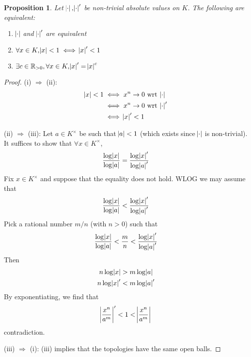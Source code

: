 \documentclass[11pt]{article}
\theoremstyle{definition}
\theoremstyle{plain}
\newtheorem{proposition}[definition]{Proposition}
\theoremstyle{remark}
\newcommand{\bR}{\mathbb{R}}
\begin{document}
\begin{proposition}\label{prop:1_3}
    Let $\abs{\cdot}, \abs{\cdot}'$ be non-trivial absolute values on $K$. The following are equivalent:
    \begin{enumerate}
        \item $\abs{\cdot}$ and $\abs{\cdot}'$ are \emph{equivalent}
        \item $\forall x \in K, \abs{x} < 1 \iff \abs{x}' < 1$
        \item $\exists c \in \bR_{> 0}, \forall x \in K, \abs{x}' = \abs{x}^c$
    \end{enumerate}
\end{proposition}
\begin{proof}
    (i) $\Rightarrow$ (ii):
    \begin{align*}
        \abs{x} < 1
        &\iff x^n \rightarrow 0 \text{ wrt } \abs{\cdot}\\
        &\iff x^n \rightarrow 0 \text{ wrt } \abs{\cdot}'\\
        &\iff \abs{x}' < 1
    \end{align*}

    \noindent(ii) $\Rightarrow$ (iii): Let $a \in K^\times$ be such that $\abs{a} < 1$ (which exists since $\abs{\cdot}$ is non-trivial). It suffices to show that $\forall x \in K^\times$,
    \begin{equation*}
        \frac{\log{\abs{x}}}{\log{\abs{a}}} = \frac{\log{\abs{x}'}}{\log{\abs{a}'}}
    \end{equation*}
    Fix $x \in K^\times$ and suppose that the equality does not hold. WLOG we may assume that
    \begin{equation*}
        \frac{\log{\abs{x}}}{\log{\abs{a}}} < \frac{\log{\abs{x}'}}{\log{\abs{a}'}}
    \end{equation*}
    Pick a rational number $m/n$ (with $n > 0$) such that
    \begin{equation*}
        \frac{\log{\abs{x}}}{\log{\abs{a}}} < \frac{m}{n} < \frac{\log{\abs{x}'}}{\log{\abs{a}'}}
    \end{equation*}
    Then
    \begin{align*}
        n \log{\abs{x}} &> m \log{\abs{a}} \\
        n \log{\abs{x}'} &< m \log{\abs{a}'}
    \end{align*}
    By exponentiating, we find that
    \begin{equation*}
        \abs{\frac{x^n}{a^m}}' < 1 < \abs{\frac{x^n}{a^m}}
    \end{equation*}
    contradiction.

    \noindent (iii) $\Rightarrow$ (i): (iii) implies that the topologies have the same open balls.
\end{proof}
\end{document}
